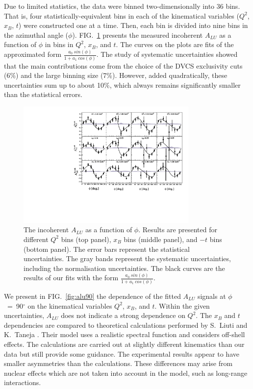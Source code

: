 \documentclass[twocolumn,nofootinbib,showpacs,prl,superscriptaddress,secnumarabic,amssymb,nobibnotes,aps,floatfix]{revtex4}
\begin{document}
Due to limited statistics, the data were binned two-dimensionally into 36 bins.  
That is, four statistically-equivalent bins in each of the kinematical 
variables ($Q^{2}$, $x_{B}$, $t$) were constructed one at a time. Then, each 
bin is divided into nine bins in the azimuthal angle ($\phi$).  
FIG.~\ref{fig:alu} presents the measured incoherent $A_{LU}$ as a function of 
$\phi$ in bins in $Q^{2}$, $x_{B}$, and $t$. The curves on the plots are fits 
of the approximated form $\frac{a_{0}~sin(\phi)}{1+ a_{1}~cos(\phi)}$. The 
study of systematic uncertainties showed that the main contributions come from 
the choice of the DVCS exclusivity cuts (6\%) and the large binning size (7\%).  
However, added quadratically, these uncertainties sum up to about 10\%, which 
always remains significantly smaller than the statistical errors.

\begin{figure}[tb]
\includegraphics[width=8.9cm]{figs/incoherent_ALU_phi.pdf}
\caption{The incoherent $A_{LU}$ as a function of $\phi$. Results are presented
   for different $Q^{2}$ bins (top panel), $x_{B}$ bins (middle panel), and 
   $-t$ bins (bottom panel). The error bars represent the statistical 
   uncertainties. The gray bands represent the systematic uncertainties, 
   including the normalisation uncertainties. The black curves are the results 
   of our fits with the form $\frac{a_{0}~sin(\phi)}{1+ a_{1}~cos(\phi)}$.}
\label{fig:alu}
\end{figure}


We present in FIG.~\ref{fig:alu90} the dependence of the fitted $A_{LU}$ 
signals at $\phi$~=~90$^{\circ}$ on the kinematical variables $Q^2$, $x_{B}$, 
and $t$. Within the given uncertainties, $A_{LU}$ does not indicate a strong 
dependence on $Q^2$. The $x_{B}$ and $t$ dependencies are compared to 
theoretical calculations performed by S.~Liuti and K.~Taneja 
\cite{simonetta_2}. Their model uses a realistic spectral function and 
considers off-shell effects. The calculations are carried out at slightly 
different kinematics than our data but still provide some guidance. The 
experimental results appear to have smaller asymmetries than the calculations.  
These differences may arise from nuclear effects which are not taken into 
account in the model, such as long-range interactions.
\end{document}
